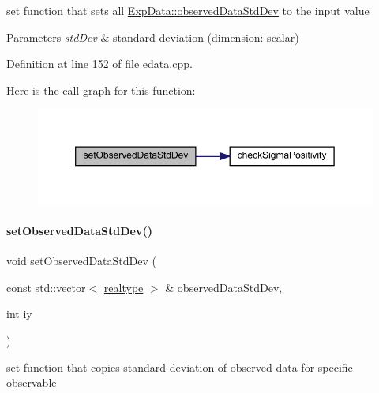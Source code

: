set function that sets all \mbox{\hyperlink{classamici_1_1_exp_data_aa097568cebb4be48c4c1dfaab0c2a159}{Exp\+Data\+::observed\+Data\+Std\+Dev}} to the input value


\begin{DoxyParams}{Parameters}
{\em std\+Dev} & standard deviation (dimension\+: scalar) \\
\hline
\end{DoxyParams}


Definition at line 152 of file edata.\+cpp.

Here is the call graph for this function\+:
\nopagebreak
\begin{figure}[H]
\begin{center}
\leavevmode
\includegraphics[width=350pt]{classamici_1_1_exp_data_ae6ed832b9bee1861d233c90d5a37c677_cgraph}
\end{center}
\end{figure}
\mbox{\label{classamici_1_1_exp_data_a90948c75e8ce51cd69be08a92215e6c2}} 
\paragraph{\texorpdfstring{set\+Observed\+Data\+Std\+Dev()}{setObservedDataStdDev()}\hspace{0.1cm}{\footnotesize\ttfamily [3/4]}}
{\footnotesize\ttfamily void set\+Observed\+Data\+Std\+Dev (\begin{DoxyParamCaption}\item[{const std\+::vector$<$ \mbox{\hyperlink{namespaceamici_a1bdce28051d6a53868f7ccbf5f2c14a3}{realtype}} $>$ \&}]{observed\+Data\+Std\+Dev,  }\item[{int}]{iy }\end{DoxyParamCaption})}

set function that copies standard deviation of observed data for specific observable


